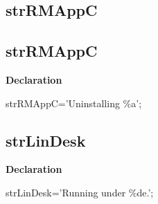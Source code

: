 \documentclass{report}
\newif\ifpdf
\begin{document}
\subsection*{\large{\textbf{strRMAppC}}\normalsize\hspace{1ex}\hrulefill}
\else
\subsection*{strRMAppC}
\fi
\label{trstrings-strRMAppC}
\begin{list}{}{
\setlength{\itemindent}{0cm}
\setlength{\listparindent}{0cm}
\setlength{\leftmargin}{\evensidemargin}
\addtolength{\leftmargin}{\tmplength}
\settowidth{\labelsep}{X}
\addtolength{\leftmargin}{\labelsep}
\setlength{\labelwidth}{\tmplength}
}
\item[\textbf{Declaration}\hfill]
\ifpdf
\begin{flushleft}
\fi
\begin{ttfamily}
strRMAppC='Uninstalling {\%}a';\end{ttfamily}

\ifpdf
\end{flushleft}
\fi

\end{list}
\ifpdf
\subsection*{\large{\textbf{strLinDesk}}\normalsize\hspace{1ex}\hrulefill}
\else
\subsection*{strLinDesk}
\fi
\label{trstrings-strLinDesk}
\begin{list}{}{
\setlength{\itemindent}{0cm}
\setlength{\listparindent}{0cm}
\setlength{\leftmargin}{\evensidemargin}
\addtolength{\leftmargin}{\tmplength}
\settowidth{\labelsep}{X}
\addtolength{\leftmargin}{\labelsep}
\setlength{\labelwidth}{\tmplength}
}
\item[\textbf{Declaration}\hfill]
\ifpdf
\begin{flushleft}
\fi
\begin{ttfamily}
strLinDesk='Running under {\%}de.';\end{ttfamily}

\ifpdf
\end{flushleft}
\fi

\end{list}
\ifpdf
\end{document}
